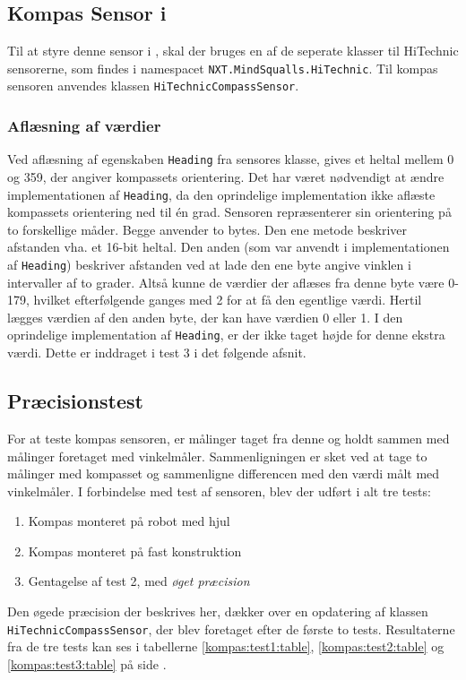 \subsection{Kompas Sensor i \mindsqualls}
Til at styre denne sensor i \mindsqualls, skal der bruges en af de seperate klasser til HiTechnic sensorerne, som findes i namespacet \lstinline[style=csharp]!NXT.MindSqualls.HiTechnic!.
Til kompas sensoren anvendes klassen \lstinline[style=csharp]!HiTechnicCompassSensor!.

\subsubsection{Aflæsning af værdier}\label{kompas:reading}
Ved aflæsning af egenskaben \lstinline[style=csharp]!Heading! fra sensores klasse, gives et heltal mellem 0 og 359, der angiver kompassets orientering.
Det har været nødvendigt at ændre implementationen af \lstinline[style=csharp]!Heading!, da den oprindelige implementation ikke aflæste kompassets orientering ned til \'en grad.
Sensoren repræsenterer sin orientering på to forskellige måder.
Begge anvender to bytes.
Den ene metode beskriver afstanden vha. et 16-bit heltal.
Den anden (som var anvendt i implementationen af \lstinline[style=csharp]!Heading!) beskriver afstanden ved at lade den ene byte angive vinklen i intervaller af to grader.
Altså kunne de værdier der aflæses fra denne byte være 0-179, hvilket efterfølgende ganges med 2 for at få den egentlige værdi.
Hertil lægges værdien af den anden byte, der kan have værdien 0 eller 1.
I den oprindelige implementation af \lstinline[style=csharp]!Heading!, er der ikke taget højde for denne ekstra værdi.
Dette er inddraget i test 3 i det følgende afsnit.

\subsection{Præcisionstest}\label{kompas:precision}
For at teste kompas sensoren, er målinger taget fra denne og holdt sammen med målinger foretaget med vinkelmåler.
Sammenligningen er sket ved at tage to målinger med kompasset og sammenligne differencen med den værdi målt med vinkelmåler.
I forbindelse med test af sensoren, blev der udført i alt tre tests:
\begin{enumerate}
\item Kompas monteret på robot med hjul
\item Kompas monteret på fast konstruktion
\item Gentagelse af test 2, med \textit{øget præcision}
\end{enumerate}
Den øgede præcision der beskrives her, dækker over en opdatering af \mindsqualls klassen \lstinline[style=csharp]!HiTechnicCompassSensor!, der blev foretaget efter de første to tests.
Resultaterne fra de tre tests kan ses i tabellerne \ref{kompas:test1:table}, \ref{kompas:test2:table} og \ref{kompas:test3:table} på side \pageref{kompas:test1:table}.


